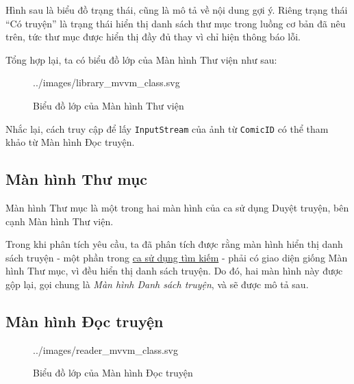 \documentclass[../../../../thesis]{subfiles}
\begin{document}
Hình sau là biểu đồ trạng thái, cũng là mô tả về nội dung gợi ý. Riêng trạng
thái ``Có truyện'' là trạng thái hiển thị danh sách thư mục trong luồng cơ bản
đã nêu trên, tức thư mục được hiển thị đầy đủ thay vì chỉ hiện thông báo lỗi.

Tổng hợp lại, ta có biểu đồ lớp của Màn hình Thư viện như sau:

\begin{figure}[H]
    \centering
    
        {../images/library_mvvm_class.svg}
    \caption{Biểu đồ lớp của Màn hình Thư viện}
    \label{fig:library_mvvm_class}
\end{figure}

Nhắc lại, cách truy cập để lấy \texttt{InputStream} của ảnh từ \texttt{ComicID}
có thể tham khảo từ Màn hình Đọc truyện.



\subsection{Màn hình Thư mục}\label{sec:folder-design}

Màn hình Thư mục là một trong hai màn hình của ca sử dụng Duyệt truyện, bên cạnh
Màn hình Thư viện.

Trong khi phân tích yêu cầu, ta đã phân tích được rằng màn hình hiển thị danh
sách truyện - một phần trong \hyperref[sec:search-comic]{ca sử dụng tìm kiếm} -
phải có giao diện giống Màn hình Thư mục, vì đều hiển thị danh sách truyện. Do
đó, hai màn hình này được gộp lại, gọi chung là \emph{Màn hình Danh sách
truyện}, và sẽ được mô tả sau.



\subsection{Màn hình Đọc truyện}\label{sec:reader-design}

\begin{wrapfigure}[8]{r}{10cm}
    \centering
    
        {../images/reader_mvvm_class.svg}
    \caption{Biểu đồ lớp của Màn hình Đọc truyện}
    \label{fig:reader_mvvm_class}
\end{wrapfigure}
\end{document}
